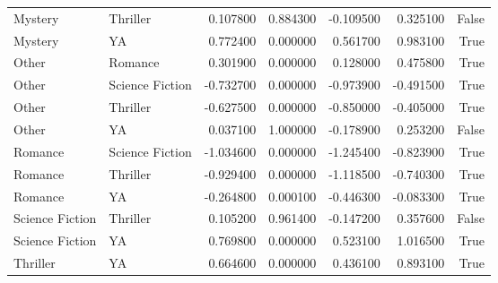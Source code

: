 \begin{tabular}{llrrrrr}
Mystery & Thriller & 0.107800 & 0.884300 & -0.109500 & 0.325100 & False \\
Mystery & YA & 0.772400 & 0.000000 & 0.561700 & 0.983100 & True \\
Other & Romance & 0.301900 & 0.000000 & 0.128000 & 0.475800 & True \\
Other & Science Fiction & -0.732700 & 0.000000 & -0.973900 & -0.491500 & True \\
Other & Thriller & -0.627500 & 0.000000 & -0.850000 & -0.405000 & True \\
Other & YA & 0.037100 & 1.000000 & -0.178900 & 0.253200 & False \\
Romance & Science Fiction & -1.034600 & 0.000000 & -1.245400 & -0.823900 & True \\
Romance & Thriller & -0.929400 & 0.000000 & -1.118500 & -0.740300 & True \\
Romance & YA & -0.264800 & 0.000100 & -0.446300 & -0.083300 & True \\
Science Fiction & Thriller & 0.105200 & 0.961400 & -0.147200 & 0.357600 & False \\
Science Fiction & YA & 0.769800 & 0.000000 & 0.523100 & 1.016500 & True \\
Thriller & YA & 0.664600 & 0.000000 & 0.436100 & 0.893100 & True \\
\bottomrule
\end{tabular}
